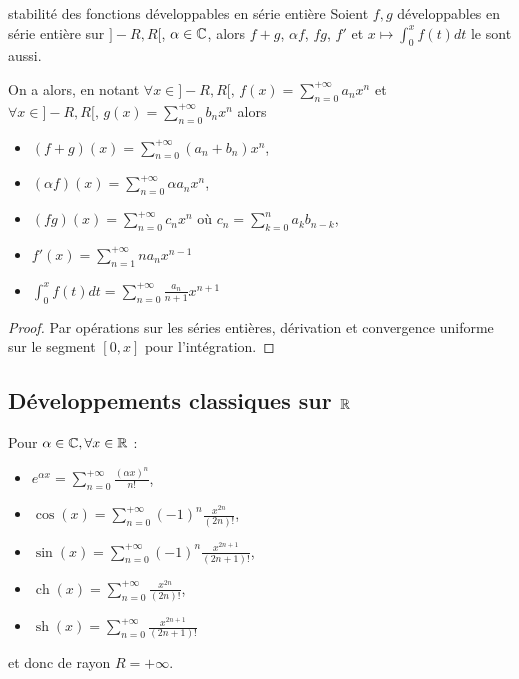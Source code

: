 \begin{proposition}{stabilité des fonctions développables en série entière}{}
    Soient $f, g$ développables en série entière sur $]-R, R[$, $\alpha \in \mathbb{C}$, alors 
    $f + g$, $\alpha f$, $fg$, $f'$ et $x \mapsto \int_0^x f(t) dt$ le sont aussi. 

\end{proposition}

On a alors, en notant $\displaystyle \forall x \in ]-R, R[, \, f(x) = \sum_{n = 0}^{+\infty} a_n x^n$ et
    $\displaystyle \forall x \in ]-R, R[, \, g(x) = \sum_{n = 0}^{+\infty} b_n x^n$ alors 
    
    \begin{itemize}
        \item $\displaystyle (f + g)(x) = \sum_{n = 0}^{+\infty} (a_n + b_n) x^n$, 
        \item $\displaystyle (\alpha f)(x) = \sum_{n = 0}^{+\infty} \alpha a_n x^n$,
        \item $\displaystyle (fg)(x) = \sum_{n = 0}^{+\infty} c_n x^n$ où $\displaystyle c_n = \sum_{k = 0}^n a_k b_{n - k}$,
        \item $\displaystyle f'(x) = \sum_{n = 1}^{+\infty} n a_n x^{n - 1}$
        \item $\displaystyle \int_0^x f(t) dt = \sum_{n = 0}^{+\infty} \frac{a_n}{n + 1} x^{n + 1}$
    \end{itemize}

\begin{proof}
    Par opérations sur les séries entières, dérivation et convergence uniforme sur le segment 
    $[0, x]$ pour l'intégration.
\end{proof}


\subsection{Développements classiques sur \texorpdfstring{$\mathbb{R}$}{R} }

\begin{proposition}{}{}
    Pour $\alpha \in \mathbb{C}, \forall x \in \mathbb{R}$ : 
    \begin{itemize}
        \item $\displaystyle e^{\alpha x} = \sum_{n = 0}^{+\infty} \frac{(\alpha x)^n}{n!}$,
        \item $\displaystyle \cos(x) = \sum_{n = 0}^{+\infty} (-1)^n \frac{x^{2n}}{(2n)!}$,
        \item $\displaystyle \sin(x) = \sum_{n = 0}^{+\infty} (-1)^n \frac{x^{2n + 1}}{(2n + 1)!}$,
        \item $\displaystyle \operatorname{ch } (x) = \sum_{n = 0}^{+\infty} \frac{x^{2n}}{(2n)!}$,
        \item $\displaystyle \operatorname{sh } (x) = \sum_{n = 0}^{+\infty} \frac{x^{2n + 1}}{(2n + 1)!}$
    \end{itemize}
    et donc de rayon $R = + \infty$.
\end{proposition}


